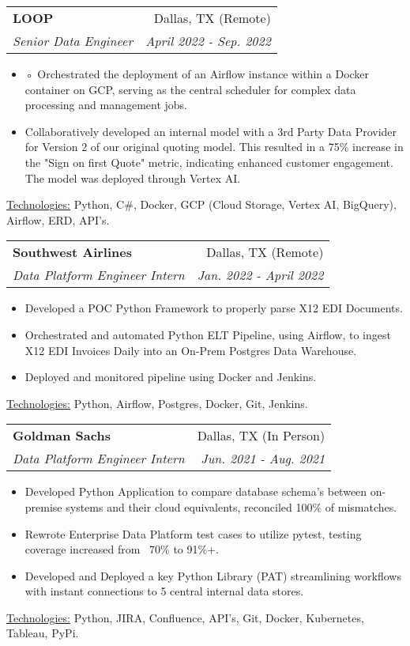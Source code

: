 \documentclass[11pt, a4paper]{article}
\makeatletter
\newcommand{\resumeItem}[1]{%
  \item\small{
    #1
  }
}
\newcommand{\resumeSubheading}[4]{
  \vspace{8pt}\item%
    \begin{tabular*}{0.97\textwidth}[t]{l@{\extracolsep{\fill}}r}
      \textbf{#1} & #2 \\
      \textit{\small#3} & \textit{\small #4} \\
    \end{tabular*}\vspace{-5pt}
}
\newcommand{\resumeItemListStart}{\begin{itemize}}
\newcommand{\resumeItemListEnd}{\end{itemize}\vspace{-5pt}}
\newcommand{\resumeTech}[2]{
 \underline{#1:} #2
}
\makeatother
\begin{document}

  \resumeSubheading
  {LOOP}{Dallas, TX (Remote)}
  {Senior Data Engineer}{April 2022 - Sep. 2022}
  \resumeItemListStart
  \resumeItem{◦ Orchestrated the deployment of an Airflow instance within a Docker container on GCP, serving as the central scheduler for complex data processing and management jobs.}
  \resumeItem{Collaboratively developed an internal model with a 3rd Party Data Provider for Version 2 of our original quoting model. This resulted in a 75\% increase in the "Sign on first Quote" metric, indicating enhanced customer engagement. The model was deployed through Vertex AI.}
  \resumeItemListEnd
  \resumeTech{Technologies}{Python, C\#, Docker, GCP (Cloud Storage, Vertex AI, BigQuery), Airflow, ERD, API's.}\\


  \resumeSubheading
  {Southwest Airlines}{Dallas, TX (Remote)}
  {Data Platform Engineer Intern}{Jan. 2022 - April 2022}
  \resumeItemListStart
  \resumeItem{Developed a POC Python Framework to properly parse X12 EDI Documents.}
  \resumeItem{Orchestrated and automated Python ELT Pipeline, using Airflow, to ingest X12 EDI Invoices Daily into an On-Prem Postgres Data Warehouse.}
  \resumeItem{Deployed and monitored pipeline using Docker and Jenkins.}
  \resumeItemListEnd
  \resumeTech{Technologies}{Python, Airflow, Postgres, Docker, Git, Jenkins.}\\



  \resumeSubheading
  {Goldman Sachs}{Dallas, TX (In Person)}
  {Data Platform Engineer Intern}{Jun. 2021 - Aug. 2021}
  \resumeItemListStart
  \resumeItem{Developed Python Application to compare database schema's between on-premise systems and their cloud equivalents, reconciled 100\% of mismatches.}
  \resumeItem{Rewrote Enterprise Data Platform test cases to utilize pytest, testing coverage increased from ~70\% to 91\%+.}
  \resumeItem{Developed and Deployed a key Python Library (PAT) streamlining workflows with instant connections to 5 central internal data stores.}
  \resumeItemListEnd
  \resumeTech{Technologies}{Python, JIRA, Confluence, API's, Git, Docker, Kubernetes, Tableau, PyPi.}\\
\end{document}
